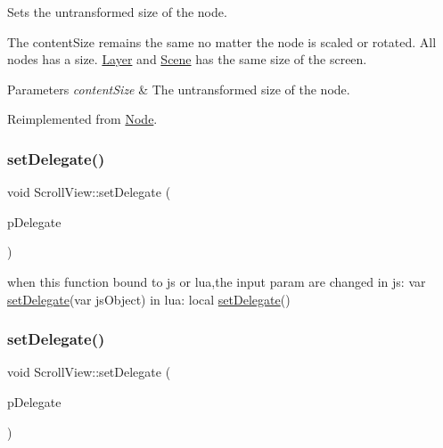 Sets the untransformed size of the node.

The content\+Size remains the same no matter the node is scaled or rotated. All nodes has a size. \hyperlink{classLayer}{Layer} and \hyperlink{classScene}{Scene} has the same size of the screen.


\begin{DoxyParams}{Parameters}
{\em content\+Size} & The untransformed size of the node. \\
\hline
\end{DoxyParams}


Reimplemented from \hyperlink{classNode_ade113d7fc9244f58ac98a4712da49818}{Node}.

\mbox{\label{classScrollView_a450371726a685f72266384598630439c}} 
\subsubsection{\texorpdfstring{set\+Delegate()}{setDelegate()}\hspace{0.1cm}{\footnotesize\ttfamily [1/2]}}
{\footnotesize\ttfamily void Scroll\+View\+::set\+Delegate (\begin{DoxyParamCaption}\item[{\hyperlink{classScrollViewDelegate}{Scroll\+View\+Delegate} $\ast$}]{p\+Delegate }\end{DoxyParamCaption})\hspace{0.3cm}{\ttfamily [inline]}}


\begin{DoxyCode}
when \textcolor{keyword}{this} \textcolor{keyword}{function} bound to js or lua,the input param are changed
in js: var \hyperlink{classScrollView_a450371726a685f72266384598630439c}{setDelegate}(var jsObject)
in lua: local \hyperlink{classScrollView_a450371726a685f72266384598630439c}{setDelegate}()
\end{DoxyCode}
 \mbox{\label{classScrollView_a450371726a685f72266384598630439c}} 
\subsubsection{\texorpdfstring{set\+Delegate()}{setDelegate()}\hspace{0.1cm}{\footnotesize\ttfamily [2/2]}}
{\footnotesize\ttfamily void Scroll\+View\+::set\+Delegate (\begin{DoxyParamCaption}\item[{\hyperlink{classScrollViewDelegate}{Scroll\+View\+Delegate} $\ast$}]{p\+Delegate }\end{DoxyParamCaption})\hspace{0.3cm}{\ttfamily [inline]}}


